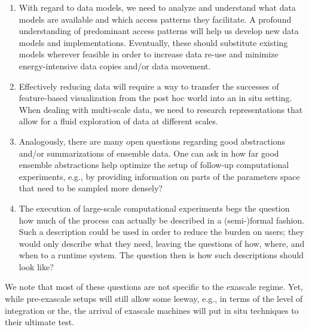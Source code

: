 \begin{refsection}
\begin{enumerate}
    \item With regard to data models, we need to analyze and understand what data models are available and which access patterns they facilitate. 
    A profound understanding of predominant access patterns will help us develop new data models and implementations. 
    Eventually, these should substitute existing models wherever feasible in order to increase data re-use and minimize energy-intensive data copies and/or data movement.
    \item Effectively reducing data will require a way to transfer the successes of feature-based visualization from the post hoc world into an in situ setting. When dealing with multi-scale data, we need to research representations that allow for a fluid exploration of data at different scales. 
    \item Analogously, there are many open questions regarding good abstractions and/or summarizations of ensemble data. 
    One can ask in how far good ensemble abstractions help optimize the setup of follow-up computational experiments, e.g., by providing information on parts of the parameters space that need to be sampled more densely?
    \item The execution of large-scale computational experiments begs the question how much of the process can actually be described in a (semi-)formal fashion. 
    Such a description could be used in order to reduce the burden on users; they would only describe what they need, leaving the questions of how, where, and when to a runtime system. 
    The question then is how such descriptions should look like?
\end{enumerate}

\noindent
We note that most of these questions are not specific to the exascale regime. 
Yet, while pre-exascale setups will still allow some leeway, e.g., in terms of the level of integration or the, the arrival of exascale machines will put in situ techniques to their ultimate test.



\end{refsection}
